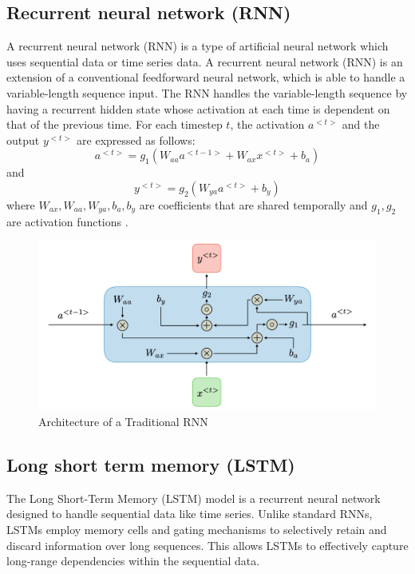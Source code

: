 \documentclass{ieeeojies}
\begin{document}
\subsection{Recurrent neural network (RNN)}
A recurrent neural network (RNN) is a type of artificial neural network which uses sequential data or time series data\cite{IBM}.  A recurrent neural network (RNN) is an extension of a conventional feedforward neural network, which is able to handle a variable-length sequence input. The RNN handles the variable-length sequence by having a recurrent hidden state whose activation at each time is dependent on that of the previous time\cite{Chung}.
For each timestep \( t \), the activation \( a^{<t>} \) and the output \( y^{<t>} \) are expressed as follows:
\[
a^{<t>} = g_1\left( W_{aa} a^{<t-1>} + W_{ax} x^{<t>} + b_a \right)
\]
and
\[
y^{<t>} = g_2\left( W_{ya} a^{<t>} + b_y \right)
\]
where \( W_{ax}, W_{aa}, W_{ya}, b_a, b_y \) are coefficients that are shared temporally and \( g_1, g_2 \) are activation functions \cite{standford}.

\begin{figure}[H]
    \centering
\begin{minipage}{0.5\textwidth}
        \centering
        \includegraphics[width=\textwidth]{bibliography/Figure/RNNmodel.png}
        \caption{Architecture of a Traditional RNN}
        \label{fig:3}
\end{minipage}
\end{figure}
\subsection{Long short term memory (LSTM)}
The Long Short-Term Memory (LSTM) model is a recurrent neural network designed to handle sequential data like time series. Unlike standard RNNs, LSTMs employ memory cells and gating mechanisms to selectively retain and discard information over long sequences. This allows LSTMs to effectively capture long-range dependencies within the sequential data.
\end{document}
